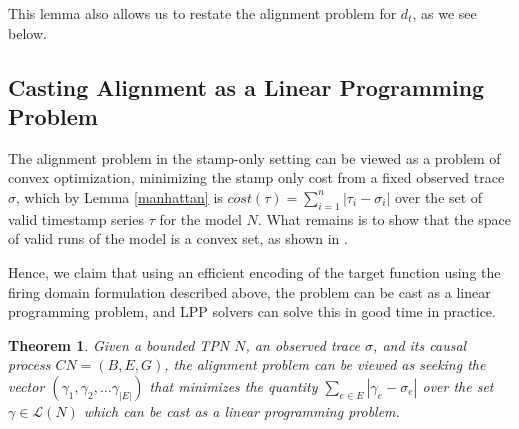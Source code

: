 \documentclass[conference]{IEEEtran}
\newtheorem{theorem}{Theorem}
\begin{document}
This lemma also allows us to restate the alignment problem for $d_t$, as we see below. 

\subsection{Casting Alignment as a Linear Programming Problem}\label{lpp}
The alignment problem in the stamp-only setting can be viewed as a problem of convex optimization, minimizing the stamp only cost from a fixed observed trace $\sigma$, which by Lemma \ref{manhattan} is $cost(\tau) = \sum_{i = 1}^{n} |\tau_i - \sigma_i|$ over the set of valid timestamp series $\tau$ for the model $N$. 
What remains is to show that the space of valid runs of the model is a convex set, as shown in \cite{berthomieu1982state}. 

Hence, we claim that using an efficient encoding of the target function using the firing domain formulation described above, the problem can be cast as a linear programming problem, and LPP solvers can solve this in good time in practice.  

\begin{theorem}\label{convexset}
	Given a bounded TPN $N$, an observed trace $\sigma$, and its causal process $CN = (B, E, G)$, the alignment problem can be viewed as seeking the vector $(\gamma_1, \gamma_2, \dots \gamma_{|E|})$ that minimizes the quantity $\sum_{e \in E} |\gamma_e - \sigma_e|$ over the set $\gamma \in \mathcal{L}(N)$ which can be cast as a linear programming problem. %
	
\end{theorem}
\end{document}
